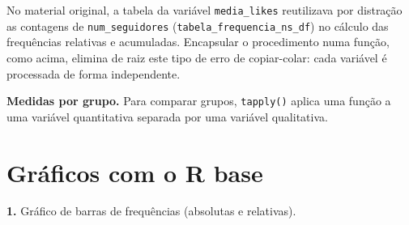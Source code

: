 \documentclass[
  portuguese,
  11pt,
  openany]{book}
\newenvironment{Shaded}{\begin{snugshade}}{\end{snugshade}}
\newcommand{\AttributeTok}[1]{\textcolor[rgb]{0.13,0.29,0.53}{#1}}
\newcommand{\FloatTok}[1]{\textcolor[rgb]{0.00,0.00,0.81}{#1}}
\newcommand{\FunctionTok}[1]{\textcolor[rgb]{0.13,0.29,0.53}{\textbf{#1}}}
\newcommand{\NormalTok}[1]{#1}
\newcommand{\SpecialCharTok}[1]{\textcolor[rgb]{0.81,0.36,0.00}{\textbf{#1}}}
\newcommand{\StringTok}[1]{\textcolor[rgb]{0.31,0.60,0.02}{#1}}
\begin{document}
No material original, a tabela da variável \texttt{media\_likes} reutilizava por
distração as contagens de \texttt{num\_seguidores} (\texttt{tabela\_frequencia\_ns\_df}) no cálculo
das frequências relativas e acumuladas. Encapsular o procedimento numa função,
como acima, elimina de raiz este tipo de erro de copiar-colar: cada variável é
processada de forma independente.

\textbf{Medidas por grupo.} Para comparar grupos, \texttt{tapply()} aplica uma função a uma
variável quantitativa separada por uma variável qualitativa.

\begin{Shaded}
\end{Shaded}

\section{Gráficos com o R base}\label{gruxe1ficos-com-o-r-base}

\textbf{1.} Gráfico de barras de frequências (absolutas e relativas).

\begin{Shaded}
\end{Shaded}
\end{document}
